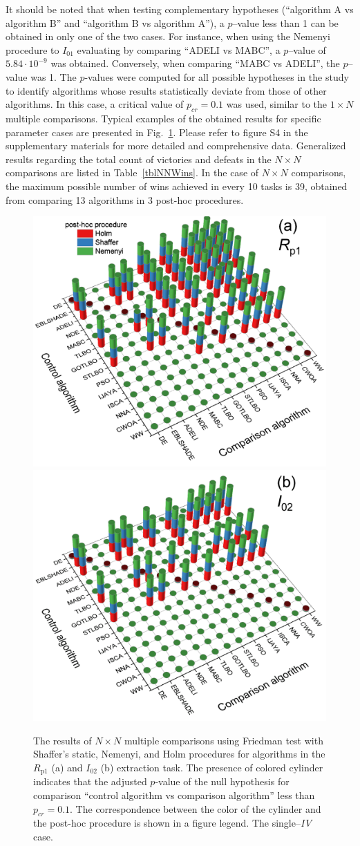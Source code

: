 \documentclass[a4paper,fleqn]{cas-sc}
\begin{document}
It should be noted that when testing complementary hypotheses
(``algorithm A vs algorithm B'' and ``algorithm B vs algorithm A''),
a $p$--value less than 1 can be obtained in only one of the two cases.
For instance, when using the Nemenyi procedure to $I_{01}$ evaluating by comparing ``ADELI vs MABC'',
a $p$--value of $5.84\cdot10^{-9}$ was obtained.
Conversely, when comparing ``MABC vs ADELI'', the $p$--value was 1.
The $p$-values were computed for all possible hypotheses in the study to identify algorithms whose results statistically deviate from those of other algorithms.
In this case, a critical value of $p_{cr}=0.1$ was used, similar to the $1\times N$ multiple comparisons.
Typical examples of the obtained results for specific parameter cases are presented in Fig.~\ref{figNNRezSingleIV}.
Please refer to figure S4 in the supplementary materials for more detailed and comprehensive data.
Generalized results regarding the total count of victories and defeats in the $N\times N$ comparisons
are listed in Table~\ref{tblNNWins}.
 In the case of $N\times N$ comparisons, the maximum possible number of wins achieved in every 10 tasks is 39,
obtained from comparing 13 algorithms in 3 post-hoc procedures.


\begin{figure}[!ht]
	\centering
		\includegraphics[width=.49\textwidth]{Fig8a}
        \includegraphics[width=.49\textwidth]{Fig8b}
	  \caption{
The results of $N\times N$ multiple comparisons using Friedman test
with Shaffer’s static, Nemenyi, and Holm procedures for algorithms in the
$R_\mathrm{p1}$ (a) and $I_{02}$ (b) extraction task.
The presence of colored cylinder indicates that the adjusted $p$-value of the null hypothesis
for comparison ``control algorithm vs comparison algorithm'' less than $p_{cr}=0.1$.
The correspondence between the color of the cylinder and the post-hoc procedure is shown in a figure legend.
The single--\emph{IV} case.
               }\label{figNNRezSingleIV}
\end{figure}
\end{document}
